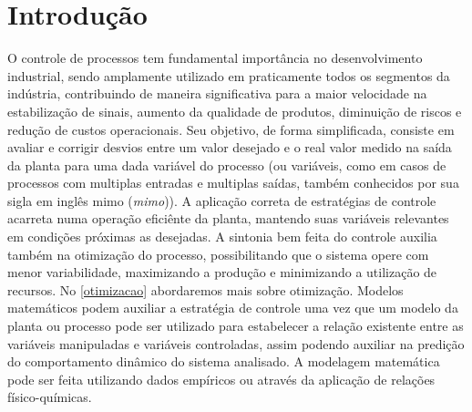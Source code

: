 \chapter{Introdução}

O controle de processos tem fundamental importância no desenvolvimento industrial, sendo amplamente utilizado em praticamente todos os segmentos da indústria, contribuindo de maneira significativa para a maior velocidade na estabilização de sinais, aumento da qualidade de produtos, diminuição de riscos e redução de custos operacionais. Seu objetivo, de forma simplificada, consiste em avaliar e corrigir desvios entre um valor desejado e o real valor medido na saída da planta para uma dada variável do processo (ou variáveis, como em casos de processos com multiplas entradas e multiplas saídas, também conhecidos por sua sigla em inglês \acrshort{mimo} (\textit{\acrlong{mimo}})). A aplicação correta de estratégias de controle acarreta numa operação eficiênte da planta, mantendo suas variáveis relevantes em condições próximas as desejadas. A sintonia bem feita do controle auxilia também na otimização do processo, possibilitando que o sistema opere com menor variabilidade, maximizando a produção e minimizando a utilização de recursos. No \autoref{otimizacao} abordaremos mais sobre otimização.
Modelos matemáticos podem auxiliar a estratégia de controle uma vez que um modelo da planta ou processo pode ser utilizado para estabelecer a relação existente entre as variáveis manipuladas e variáveis controladas, assim podendo auxiliar na predição do comportamento dinâmico do sistema analisado. A modelagem matemática pode ser feita utilizando dados empíricos ou através da aplicação de relações físico-químicas.

